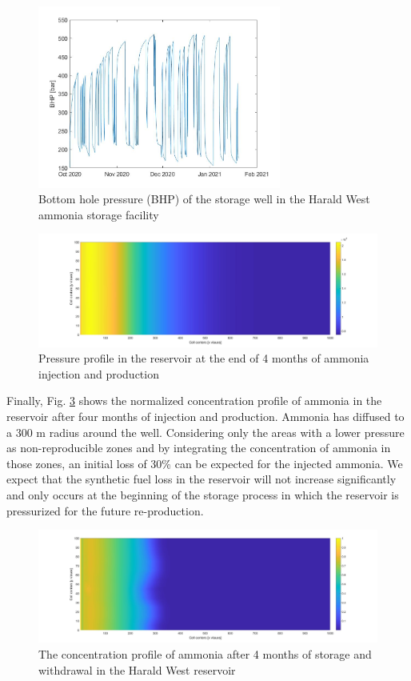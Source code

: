 \documentclass{ECOS_2021}
\begin{document}
\begin{figure}[H]
\includegraphics[width=8cm]{ammonia_p_hist}

\caption{\label{fig:Bottom-hole-pressure-NH3}Bottom hole pressure (BHP) of
the storage well in the Harald West ammonia storage facility}
\end{figure}

\begin{figure}[H]
\includegraphics[width=14cm]{ammonia_pressure_harald}

\caption{\label{fig:Pressure-profile-NH3}Pressure profile in the reservoir
at the end of 4 months of ammonia injection and production}
\end{figure}

Finally, Fig. \ref{fig:concentration-profile-NH3} shows the normalized
concentration profile of ammonia in the reservoir after four months
of injection and production. Ammonia has diffused to a 300 m radius
around the well. Considering only the areas with a lower pressure
as non-reproducible zones and by integrating the concentration of
ammonia in those zones, an initial loss of 30\% can be expected for
the injected ammonia. We expect that the synthetic fuel loss in the
reservoir will not increase significantly and only occurs at the beginning
of the storage process in which the reservoir is pressurized for the
future re-production. 

\begin{figure}[H]
\includegraphics[width=14cm]{ammonia_tracer_harald}

\caption{\label{fig:concentration-profile-NH3}The concentration profile of
ammonia after 4 months of storage and withdrawal in the Harald West
reservoir}
\end{figure}
\end{document}
